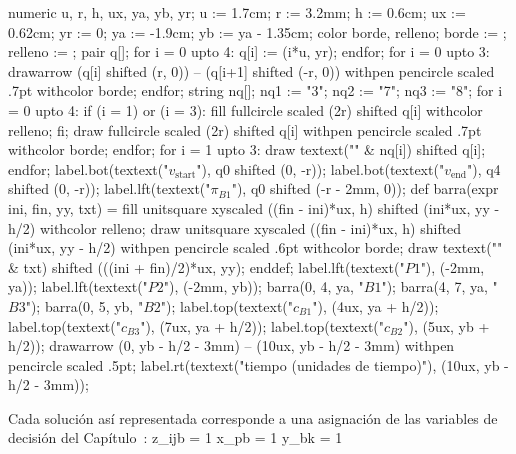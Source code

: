 {\startMPcode
numeric u, r, h, ux, ya, yb, yr;
u := 1.7cm; r := 3.2mm; h := 0.6cm; ux := 0.62cm;
yr := 0; ya := -1.9cm; yb := ya - 1.35cm;
color borde, relleno; borde := ; relleno := ;
pair q[];
for i = 0 upto 4: q[i] := (i*u, yr); endfor;
for i = 0 upto 3:
  drawarrow (q[i] shifted (r, 0)) -- (q[i+1] shifted (-r, 0)) withpen pencircle scaled .7pt withcolor borde;
endfor;
string nq[]; nq1 := "3"; nq2 := "7"; nq3 := "8";
for i = 0 upto 4:
  if (i = 1) or (i = 3): fill fullcircle scaled (2r) shifted q[i] withcolor relleno; fi;
  draw fullcircle scaled (2r) shifted q[i] withpen pencircle scaled .7pt withcolor borde;
endfor;
for i = 1 upto 3: draw textext("\tfx " & nq[i]) shifted q[i]; endfor;
label.bot(textext("\tfx $v_{\text{start}}$"), q0 shifted (0, -r));
label.bot(textext("\tfx $v_{\text{end}}$"), q4 shifted (0, -r));
label.lft(textext("$\pi_{B1}$"), q0 shifted (-r - 2mm, 0));
def barra(expr ini, fin, yy, txt) =
  fill unitsquare xyscaled ((fin - ini)*ux, h) shifted (ini*ux, yy - h/2) withcolor relleno;
  draw unitsquare xyscaled ((fin - ini)*ux, h) shifted (ini*ux, yy - h/2) withpen pencircle scaled .6pt withcolor borde;
  draw textext("\tfx " & txt) shifted (((ini + fin)/2)*ux, yy);
enddef;
label.lft(textext("\tfx $P1$"), (-2mm, ya));
label.lft(textext("\tfx $P2$"), (-2mm, yb));
barra(0, 4, ya, "$B1$");
barra(4, 7, ya, "$B3$");
barra(0, 5, yb, "$B2$");
label.top(textext("\tfx $c_{B1}$"), (4ux, ya + h/2));
label.top(textext("\tfx $c_{B3}$"), (7ux, ya + h/2));
label.top(textext("\tfx $c_{B2}$"), (5ux, yb + h/2));
drawarrow (0, yb - h/2 - 3mm) -- (10ux, yb - h/2 - 3mm) withpen pencircle scaled .5pt;
label.rt(textext("\tfx tiempo (unidades de tiempo)"), (10ux, yb - h/2 - 3mm));
\stopMPcode}


Cada solución así representada corresponde a una asignación de las variables
de decisión del Capítulo~\in[Capitulo_3]:
\startformula
	\startalign[n=2, align={right,left}]
		\NC z_{ijb} = 1 \NC \quad {} \NR
		\NC x_{pb} = 1 \NC \quad {} \NR
		\NC y_{bk} = 1 \NC \quad {} \NR
	\stopalign
\stopformula


